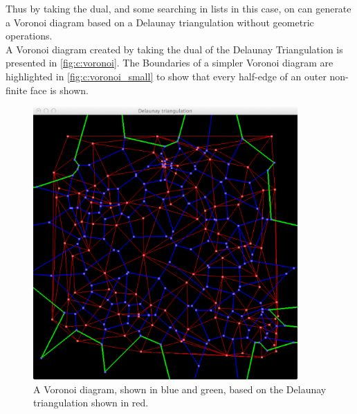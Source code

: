 Thus by taking the dual, and some searching in lists in this case, on can generate a Voronoi diagram based on a Delaunay triangulation without geometric operations.\\

A Voronoi diagram created by taking the dual of the Delaunay Triangulation is presented in \autoref{fig:c:voronoi}. The Boundaries of a simpler Voronoi diagram are highlighted in \autoref{fig:c:voronoi_small} to show that every half-edge of an outer non-finite face is shown. 

\begin{figure}
	\begin{minipage}[t]{0.45\textwidth}
		\centering
		\includegraphics[width=0.9\textwidth]{./img/c_voronoi}
		\caption{A Voronoi diagram, shown in blue and green, based on the Delaunay triangulation shown in red.}
		\label{fig:c:voronoi}		
	\end{minipage}
	\hspace{0.1\textwidth}
	\begin{minipage}[t]{0.45\textwidth}
		\centering

\end{minipage}
\end{figure}
